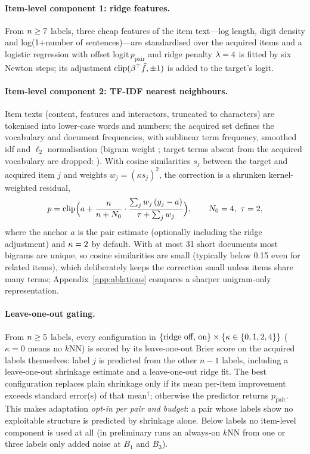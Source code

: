 \documentclass{article}
\begin{document}
\paragraph{Item-level component 1: ridge features.}
From $n\ge7$ labels, three cheap features of the item text---log length, digit density and log(1+number of sentences)---are standardised over the acquired items and a logistic regression with offset $\mathrm{logit}\,p_{\mathrm{pair}}$ and ridge penalty $\lambda=4$ is fitted by six Newton steps; its adjustment $\mathrm{clip}(\beta^\top \tilde f,\pm1)$ is added to the target's logit.

\paragraph{Item-level component 2: TF-IDF nearest neighbours.}
Item texts (content, features and interactors, truncated to \CMaxTextChars{} characters) are tokenised into lower-case words and numbers; the acquired set defines the vocabulary and document frequencies, with sublinear term frequency, smoothed idf and $\ell_2$ normalisation (bigram weight \CBigramWeight; target terms absent from the acquired vocabulary are dropped: \CRestrictOov). With cosine similarities $s_j$ between the target and acquired item $j$ and weights $w_j=(\kappa s_j)^2$, the correction is a shrunken kernel-weighted residual,
\begin{equation}
p = \mathrm{clip}\Big(a + \frac{n}{n+N_0}\cdot\frac{\sum_j w_j\,(y_j-a)}{\tau+\sum_j w_j}\Big),\qquad N_0=4,\ \tau=2,
\end{equation}
where the anchor $a$ is the pair estimate (optionally including the ridge adjustment) and $\kappa=2$ by default. With at most 31 short documents most bigrams are unique, so cosine similarities are small (typically below 0.15 even for related items), which deliberately keeps the correction small unless items share many terms; Appendix~\ref{app:ablations} compares a sharper unigram-only representation.

\paragraph{Leave-one-out gating.}
From $n\ge5$ labels, every configuration in $\{\text{ridge off, on}\}\times\{\kappa\in\{0,1, 2, 4\}\}$ ($\kappa=0$ means no $k$NN) is scored by its leave-one-out Brier score on the acquired labels themselves: label $j$ is predicted from the other $n-1$ labels, including a leave-one-out shrinkage estimate and a leave-one-out ridge fit. The best configuration replaces plain shrinkage only if its mean per-item improvement exceeds \CLooSeMult{} standard error(s) of that mean$^\dagger$; otherwise the predictor returns $p_{\mathrm{pair}}$. This makes adaptation \emph{opt-in per pair and budget}: a pair whose labels show no exploitable structure is predicted by shrinkage alone. Below \CLooMinN{} labels no item-level component is used at all (in preliminary runs an always-on $k$NN from one or three labels only added noise at $B_1$ and $B_3$).
\end{document}
